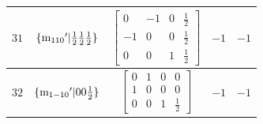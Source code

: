 \documentclass[fleqn,8pt]{jsarticle}
\begin{document}
\begin{longtable}{ccccc}
$ 31 $ & $ \{{\rm m}_{110}{}'|\frac{1}{2} \frac{1}{2} \frac{1}{2}\} $ & $ \begin{bmatrix} 0 & -1 & 0 & \frac{1}{2} \\ -1 & 0 & 0 & \frac{1}{2} \\ 0 & 0 & 1 & \frac{1}{2} \end{bmatrix} $ & $ -1 $ & $ -1 $ \\ \hline
$ 32 $ & $ \{{\rm m}_{1-10}{}'|0 0 \frac{1}{2}\} $ & $ \begin{bmatrix} 0 & 1 & 0 & 0 \\ 1 & 0 & 0 & 0 \\ 0 & 0 & 1 & \frac{1}{2} \end{bmatrix} $ & $ -1 $ & $ -1 $ \\
\end{longtable}
\end{document}
